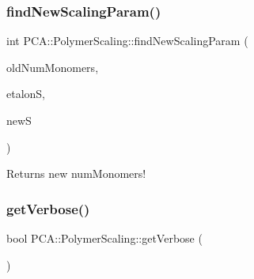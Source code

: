 \subsubsection{\texorpdfstring{find\+New\+Scaling\+Param()}{findNewScalingParam()}}
{\footnotesize\ttfamily int P\+C\+A\+::\+Polymer\+Scaling\+::find\+New\+Scaling\+Param (\begin{DoxyParamCaption}\item[{int}]{old\+Num\+Monomers,  }\item[{const \hyperlink{class_p_c_a_1_1_polymer_scaling_1_1_scaling_param}{Scaling\+Param} \&}]{etalonS,  }\item[{\hyperlink{class_p_c_a_1_1_polymer_scaling_1_1_scaling_param}{Scaling\+Param} $\ast$}]{newS }\end{DoxyParamCaption})\hspace{0.3cm}{\ttfamily [static]}}



Returns new num\+Monomers! 

\hypertarget{class_p_c_a_1_1_polymer_scaling_a9c421969a837baea23237375653898f6}{}\label{class_p_c_a_1_1_polymer_scaling_a9c421969a837baea23237375653898f6} 
\subsubsection{\texorpdfstring{get\+Verbose()}{getVerbose()}}
{\footnotesize\ttfamily bool P\+C\+A\+::\+Polymer\+Scaling\+::get\+Verbose (\begin{DoxyParamCaption}{ }\end{DoxyParamCaption})\hspace{0.3cm}{\ttfamily [static]}}

\hypertarget{class_p_c_a_1_1_polymer_scaling_a18511591a08a3c6bc6e5fbc48b488a41}{}\label{class_p_c_a_1_1_polymer_scaling_a18511591a08a3c6bc6e5fbc48b488a41} 
